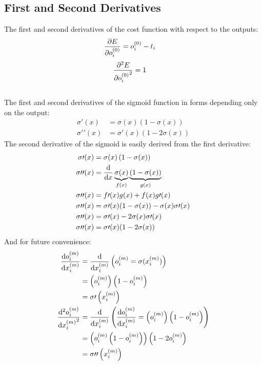 \subsection{First and Second Derivatives} 
The first and second derivatives of the cost function with respect to the outputs:
\begin{align}
\pdv{E}{o_{i}^{(0)}} &= o_{i}^{(0)} - t_{i} \label{cost_func_derivative}
\end{align}
\begin{align}
\pdv[2]{E}{{o_{i}^{(0)}}} &= 1\label{cost_func_2nd_derivative}
\end{align}
\\[5pt]
The first and second derivatives of the sigmoid function in forms depending only on the output:
\begin{align}
\sigma\prime(x) &= \sigma(x)\left(1 - \sigma(x)\right)\label{sigmoid_derivative} 
\\
\sigma\prime\prime(x) &= \sigma\prime(x)\left(1 - 2\sigma(x)\right) \label{sigmoid_2nd_derivative}
\end{align}
The second derivative of the sigmoid is easily derived from the first derivative:
\begin{align}
\sigma\prime(x) &= \sigma(x)\left(1 - \sigma(x)\right)
\\
\sigma\prime\prime(x) &= \dv{}{x}
\underbrace{\sigma(x)}_{f(x)}
\underbrace{\left(1 - \sigma(x)\right)}_{g(x)}
\\
\sigma\prime\prime(x) &= f\prime(x)g(x) + f(x)g\prime(x)
\\
\sigma\prime\prime(x) &= \sigma\prime(x)(1-\sigma(x)) - \sigma(x)\sigma\prime(x)
\\
\sigma\prime\prime(x) &= \sigma\prime(x) - 2\sigma(x)\sigma\prime(x)
\\
\sigma\prime\prime(x) &= \sigma\prime(x)(1 - 2\sigma(x))
\end{align}
And for future convenience: 
\begin{align}
\dv{o_{i}^{(m)}}{x_{i}^{(m)}} &= 
\dv{}{x_{i}^{(m)}}\left({o_{i}^{(m)}} = \sigma(x_{i}^{(m)})\right) 
\\
&= \left(o_{i}^{(m)}\right)\left(1 - o_{i}^{(m)}\right)
\\
&= \sigma\prime\left(x_{i}^{(m)}\right)
\\
\dv[2]{{o_{i}^{(m)}}}{{x_{i}^{(m)}}} &=
\dv{}{{x_{i}^{(m)}}}\left(\dv{o_{i}^{(m)}}{x_{i}^{(m)}} = \left(o_{i}^{(m)}\right)\left(1 - o_{i}^{(m)}\right)\right)
\\
&= \left(o_{i}^{(m)}\left(1 - o_{i}^{(m)}\right)\right)\left(1 - 2o_{i}^{(m)}\right)
\\
&= \sigma\prime\prime\left(x_{i}^{(m)}\right)
\end{align}
